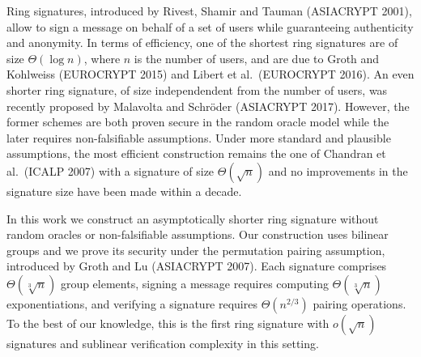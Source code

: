 
Ring signatures, introduced by Rivest, Shamir and Tauman (ASIACRYPT 2001), allow to sign a message on behalf of a set of users while guaranteeing authenticity and anonymity. In terms of efficiency, one of the shortest ring signatures are of size $\Theta(\log n)$, where $n$ is the number of users, and are due to Groth and Kohlweiss (EUROCRYPT 2015) and Libert et al.~(EUROCRYPT 2016). An even shorter ring signature, of size independendent from the number of users, was recently proposed by Malavolta and  Schr\"oder (ASIACRYPT 2017).
However, the former schemes are both proven secure in the random oracle model while the later requires non-falsifiable assumptions. Under more standard and plausible assumptions, the most efficient construction remains the one of Chandran et al.~(ICALP 2007) with a signature of size $\Theta(\sqrt{n})$ and no improvements in the signature size have been made within a decade.

In this work we construct an asymptotically shorter ring signature without random oracles or non-falsifiable assumptions. Our construction uses bilinear groups and we prove its security under the permutation pairing assumption, introduced by Groth and Lu (ASIACRYPT 2007).
 Each signature comprises $\Theta(\sqrt[3]{n})$ group elements, signing a message requires computing $\Theta(\sqrt[3]{n})$ exponentiations, and verifying a signature requires $\Theta(n^{2/3})$ pairing operations. To the best of our knowledge, this is the first ring signature with $o(\sqrt{n})$ signatures and sublinear verification complexity in this setting.
